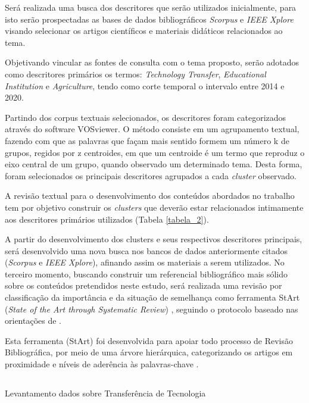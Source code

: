 Será realizada uma busca dos descritores que serão utilizados inicialmente, para isto serão prospectadas as bases de dados bibliográficos \textit{Scorpus} e \textit{IEEE Xplore} visando selecionar os artigos científicos e materiais didáticos relacionados ao tema.

Objetivando vincular as fontes de consulta com o tema proposto, serão adotados como descritores primários os termos: \textit{Technology Transfer}, \textit{Educational Institution} e \textit{Agriculture}, tendo como corte temporal o intervalo entre 2014 e 2020. 

Partindo dos corpus textuais selecionados, os descritores foram categorizados através do software VOSviewer. O método consiste em um agrupamento textual, fazendo com que as palavras que façam mais sentido formem um número k de grupos, regidos por z centroides, em que um centroide é um termo que reproduz o eixo central de um grupo, quando observado um determinado tema. Desta forma, foram selecionados os principais descritores agrupados a cada \textit{cluster} observado. 


A revisão textual para o desenvolvimento dos conteúdos abordados no trabalho tem por objetivo construir os \textit{clusters} que deverão estar relacionados intimamente aos descritores primários utilizados (Tabela \ref{tabela_2}). 



A partir do desenvolvimento dos clusters e seus respectivos descritores principais, será desenvolvido uma nova busca nos bancos de dados anteriormente citados (\textit{Scorpus} e \textit{IEEE Xplore}), afinando assim os materiais a serem utilizados. No terceiro momento, buscando construir um referencial bibliográfico mais sólido sobre os conteúdos pretendidos neste estudo, será realizada uma revisão por classificação da importância e da situação de semelhança como ferramenta StArt (\textit{State of the Art through Systematic Review}) \cite{LaPES2005StArtSoftware}, seguindo o protocolo baseado nas orientações de . 

Esta ferramenta (StArt) foi desenvolvida para apoiar todo processo de Revisão Bibliográfica, por meio de uma árvore hierárquica, categorizando os artigos em proximidade e níveis de aderência às palavras-chave \cite{Hernandes2010AvaliacaoGQM}.


\subsection{}{Levantamento dados sobre Transferência de Tecnologia}

